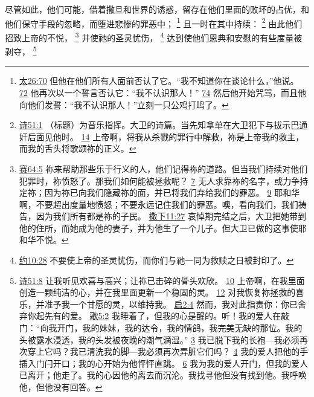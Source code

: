 \documentclass[12pt, a4paper, oneside]{ctexart}
\newcounter{parnum}[section]
\newcommand{\N}{%
   \noindent\refstepcounter{parnum}%
    \makebox[\parindent][l]{\textbf{\arabic{parnum}.}}}
\begin{document}
\N 尽管如此，他们可能，借着撒旦和世界的诱惑，留存在他们里面的败坏的占优，和他们保守手段的忽略，而堕进悲惨的罪恶中；
	\footnote {
		\href{https://biblehub.com/matthew/26-70.htm}{太26:70} 但他在他们所有人面前否认了它。“我不知道你在谈论什么，”他说。
		\href{https://biblehub.com/matthew/26-72.htm}{72} 他再次以一个誓言否认它：“我不认识那人！”
		\href{https://biblehub.com/matthew/26-74.htm}{74} 然后他开始咒骂，而且他向他们发誓：“我不认识那人！”立刻一只公鸡打鸣了。
	}
	且一时在其中持续：
	\footnote {
		\href{https://biblehub.com/psalms/51-1.htm}{诗51:1} （标题）为音乐指挥。大卫的诗篇。当先知拿单在大卫犯下与拔示巴通奸后面见他时。
		\href{https://biblehub.com/psalms/51-14.htm}{14} 上帝啊，将我从杀戮的罪行中解救，祢是上帝我的救主，而我的舌头将歌颂祢的正义。
	}
	由此他们招致上帝的不悦，
	\footnote {
		\href{https://biblehub.com/isaiah/64-5.htm}{赛64:5} 祢来帮助那些乐于行义的人，他们记得祢的道路。但当我们持续对他们犯罪时，祢愤怒了。那我们如何能被拯救呢？
		\href{https://biblehub.com/isaiah/64-7.htm}{7} 无人求靠祢的名字，或力争持定祢；因为祢已向我们隐藏祢的面，并已将我们弃给我们的罪恶。
		\href{https://biblehub.com/isaiah/64-9.htm}{9} 耶和华啊，不要超出度量地愤怒；不要永远记住我们的罪恶。噢，看向我们，我们祷告，因为我们所有都是祢的子民。
		\href{https://biblehub.com/2_samuel/11-27.htm}{撒下11:27} 哀悼期完结之后，大卫把她带到他的住所，而她成为他的妻子，并为他生了一个儿子。但大卫已做的这事使耶和华不悦。
	}
	并使祂的圣灵忧伤，
	\footnote {
		\href{https://biblehub.com/ephesians/4-30.htm}{约10:28} 不要使上帝的圣灵忧伤，而你们与祂一同为救赎之日被封印了。
	}
	达到使他们恩典和安慰的有些度量被剥夺，
	\footnote {
		\href{https://biblehub.com/psalms/51-8.htm}{诗51:8} 让我听见欢喜与高兴；让祢已击碎的骨头欢欣。
		\href{https://biblehub.com/psalms/51-10.htm}{10} 上帝啊，在我里面创造一颗纯洁的心，并在我里面更新一个稳固的灵。
		\href{https://biblehub.com/psalms/51-12.htm}{12} 对我恢复祢拯救的喜乐，并准予我一个甘愿的灵，以维持我。
		\href{https://biblehub.com/revelation/2-4.htm}{启2:4} 然而，我对此指责你：你已舍弃你起先有的爱。
		\href{https://biblehub.com/songs/5-2.htm}{歌5:2} 我睡着了，但我的心是醒的。听！我的爱人在敲门：“向我开门，我的妹妹，我的达令，我的情鸽，我完美无缺的那位。我的头被露水浸透，我的头发被夜晚的潮气滴湿。”
		\href{https://biblehub.com/songs/5-3.htm}{3} 我已脱下我的长袍---我必须再次穿上它吗？我已清洗我的脚---我必须再次弄脏它们吗？
		\href{https://biblehub.com/songs/5-4.htm}{4} 我的爱人把他的手插入门闩开口；我的心开始为他怦怦直跳。
		\href{https://biblehub.com/songs/5-6.htm}{6} 我为我的爱人开门，但我的爱人已离开；他走了。我的心因他的离去而沉沦。我找寻他但没有找到他。我呼唤他，但他没有回答。
	}
\end{document}
